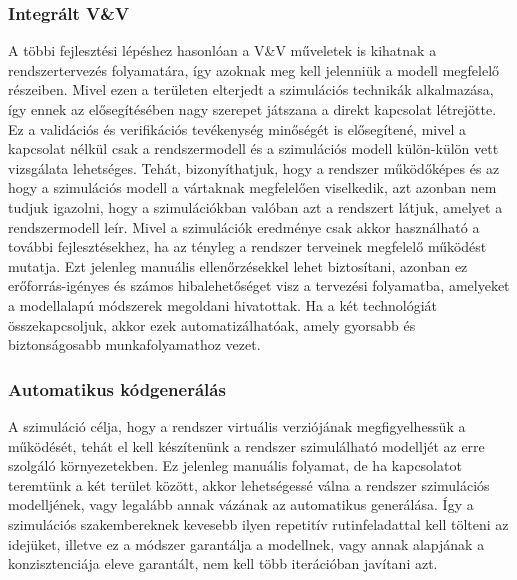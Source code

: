         \subsubsection{Integrált V\&V}
        A többi fejlesztési lépéshez hasonlóan a V\&V műveletek is kihatnak a rendszertervezés folyamatára, így azoknak meg kell jelenniük a modell megfelelő részeiben.
        Mivel ezen a területen elterjedt a szimulációs technikák alkalmazása, így ennek az elősegítésében nagy szerepet játszana a direkt kapcsolat létrejötte.
        Ez a validációs és verifikációs tevékenység minőségét is elősegítené, mivel a kapcsolat nélkül csak a rendszermodell és a szimulációs modell külön-külön vett vizsgálata lehetséges.
        Tehát, bizonyíthatjuk, hogy a rendszer működőképes és az hogy a szimulációs modell a vártaknak megfelelően viselkedik, azt azonban nem tudjuk igazolni, hogy a szimulációkban valóban azt a rendszert látjuk, amelyet a rendszermodell leír.
        Mivel a szimulációk eredménye csak akkor használható a további fejlesztésekhez, ha az tényleg a rendszer terveinek megfelelő működést mutatja.
        Ezt jelenleg manuális ellenőrzésekkel lehet biztosítani, azonban ez erőforrás-igényes és számos hibalehetőséget visz a tervezési folyamatba, amelyeket a modellalapú módszerek megoldani hivatottak.
        Ha a két technológiát összekapcsoljuk, akkor ezek automatizálhatóak, amely gyorsabb és biztonságosabb munkafolyamathoz vezet.

        \subsubsection{Automatikus kódgenerálás}
        A szimuláció célja, hogy a rendszer virtuális verziójának megfigyelhessük a működését, tehát el kell készítenünk a rendszer szimulálható modelljét az erre szolgáló környezetekben.
        Ez jelenleg manuális folyamat, de ha kapcsolatot teremtünk a két terület között, akkor lehetségessé válna a rendszer szimulációs modelljének, vagy legalább annak vázának az automatikus generálása.
        Így a szimulációs szakembereknek kevesebb ilyen repetitív rutinfeladattal kell tölteni az idejüket, illetve ez a módszer garantálja a modellnek, vagy annak alapjának a konzisztenciája eleve garantált, nem kell több iterációban javítani azt.

